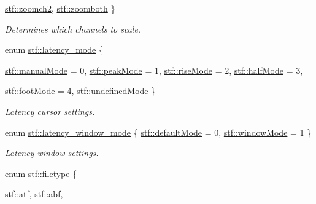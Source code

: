 \begin{DoxyCompactItemize}
\hyperlink{group__stfgen_gga9a792b11c01e9429bfe2acd3e4ef108baef0062d1da678e4771bf559b3dc1e537}{stf::zoomch2}, 
\hyperlink{group__stfgen_gga9a792b11c01e9429bfe2acd3e4ef108ba0c34eab028555c38760abc86b551b6c6}{stf::zoomboth}
 \}
\begin{DoxyCompactList}\small\item\em Determines which channels to scale. \item\end{DoxyCompactList}\item 
enum \hyperlink{group__stfgen_ga738f9934a45a9d2d81cb0a3de0375c99}{stf::latency\_\-mode} \{ \par
\hyperlink{group__stfgen_gga738f9934a45a9d2d81cb0a3de0375c99a38b8edc5f8a706c23b6efd737aada25a}{stf::manualMode} =  0, 
\hyperlink{group__stfgen_gga738f9934a45a9d2d81cb0a3de0375c99a42837a2123b13815fb4ee3c005f2cac0}{stf::peakMode} =  1, 
\hyperlink{group__stfgen_gga738f9934a45a9d2d81cb0a3de0375c99abbb23ece92fe176e5358289e2b14f97e}{stf::riseMode} =  2, 
\hyperlink{group__stfgen_gga738f9934a45a9d2d81cb0a3de0375c99ae23bd76db1d3f2fd5ee275c5dc004283}{stf::halfMode} =  3, 
\par
\hyperlink{group__stfgen_gga738f9934a45a9d2d81cb0a3de0375c99a216dce55e173d3838de785cf0a42d87e}{stf::footMode} =  4, 
\hyperlink{group__stfgen_gga738f9934a45a9d2d81cb0a3de0375c99a871047aafad5c561dbf5a77e80a7b174}{stf::undefinedMode}
 \}
\begin{DoxyCompactList}\small\item\em Latency cursor settings. \item\end{DoxyCompactList}\item 
enum \hyperlink{group__stfgen_gae034ed0eec6bdaba3b23d3b2184f799d}{stf::latency\_\-window\_\-mode} \{ \hyperlink{group__stfgen_ggae034ed0eec6bdaba3b23d3b2184f799da65ce55297aad4c581e70b239864c2a16}{stf::defaultMode} =  0, 
\hyperlink{group__stfgen_ggae034ed0eec6bdaba3b23d3b2184f799daf28fa2b9cdf5e498f1ed689e1d8d1934}{stf::windowMode} =  1
 \}
\begin{DoxyCompactList}\small\item\em Latency window settings. \item\end{DoxyCompactList}\item 
enum \hyperlink{group__stfgen_gae703f7802498ae301ac058b94426900f}{stf::filetype} \{ \par
\hyperlink{group__stfgen_ggae703f7802498ae301ac058b94426900fa0136c00f38aa0ad185d30d7c845f38b5}{stf::atf}, 
\hyperlink{group__stfgen_ggae703f7802498ae301ac058b94426900fa5496504b8584246c4ee5820087f94be2}{stf::abf}, 

\end{DoxyCompactItemize}
